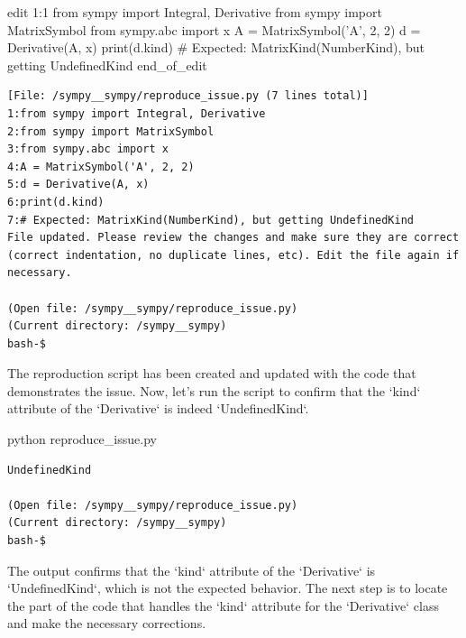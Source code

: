 {\begin{agentbox}
\hrulefill
\begin{CodeVerbatim}[breaklines=true, breakanywhere=true]
edit 1:1
from sympy import Integral, Derivative
from sympy import MatrixSymbol
from sympy.abc import x
A = MatrixSymbol('A', 2, 2)
d = Derivative(A, x)
print(d.kind)
# Expected: MatrixKind(NumberKind), but getting UndefinedKind
end_of_edit
\end{CodeVerbatim}
\end{agentbox}
\begin{observationbox}\begin{Verbatim}[breaklines=true, breakanywhere=true]
[File: /sympy__sympy/reproduce_issue.py (7 lines total)]
1:from sympy import Integral, Derivative
2:from sympy import MatrixSymbol
3:from sympy.abc import x
4:A = MatrixSymbol('A', 2, 2)
5:d = Derivative(A, x)
6:print(d.kind)
7:# Expected: MatrixKind(NumberKind), but getting UndefinedKind
File updated. Please review the changes and make sure they are correct (correct indentation, no duplicate lines, etc). Edit the file again if necessary.

(Open file: /sympy__sympy/reproduce_issue.py)
(Current directory: /sympy__sympy)
bash-$
\end{Verbatim}
\end{observationbox}
\begin{agentbox}
The reproduction script has been created and updated with the code that demonstrates the issue. Now, let's run the script to confirm that the `kind` attribute of the `Derivative` is indeed `UndefinedKind`.



\hrulefill
\begin{CodeVerbatim}[breaklines=true, breakanywhere=true]
python reproduce_issue.py
\end{CodeVerbatim}
\end{agentbox}
\begin{observationbox}\begin{Verbatim}[breaklines=true, breakanywhere=true]
UndefinedKind

(Open file: /sympy__sympy/reproduce_issue.py)
(Current directory: /sympy__sympy)
bash-$
\end{Verbatim}
\end{observationbox}
\begin{agentbox}
The output confirms that the `kind` attribute of the `Derivative` is `UndefinedKind`, which is not the expected behavior. The next step is to locate the part of the code that handles the `kind` attribute for the `Derivative` class and make the necessary corrections.




\end{agentbox}}
